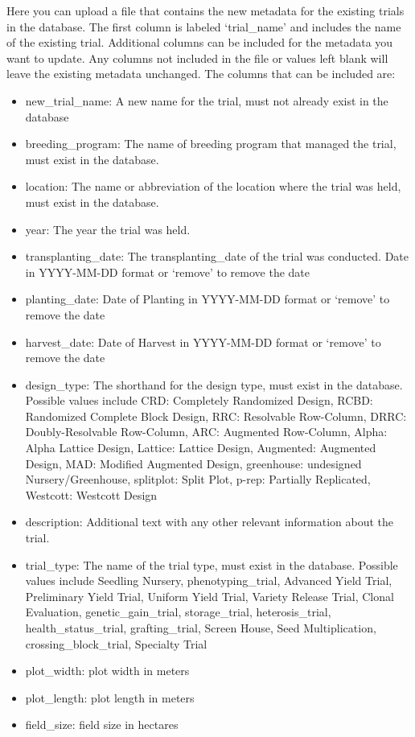 \documentclass[
  12pt,
]{book}
\providecommand{\tightlist}{%
  \setlength{\itemsep}{0pt}\setlength{\parskip}{0pt}}
\begin{document}
Here you can upload a file that contains the new metadata for the existing trials in the database. The first column is labeled `trial\_name' and includes the name of the existing trial. Additional columns can be included for the metadata you want to update. Any columns not included in the file or values left blank will leave the existing metadata unchanged. The columns that can be included are:

\begin{itemize}
\tightlist
\item
  new\_trial\_name: A new name for the trial, must not already exist in the database
\item
  breeding\_program: The name of breeding program that managed the trial, must exist in the database.
\item
  location: The name or abbreviation of the location where the trial was held, must exist in the database.
\item
  year: The year the trial was held.
\item
  transplanting\_date: The transplanting\_date of the trial was conducted. Date in YYYY-MM-DD format or `remove' to remove the date
\item
  planting\_date: Date of Planting in YYYY-MM-DD format or `remove' to remove the date
\item
  harvest\_date: Date of Harvest in YYYY-MM-DD format or `remove' to remove the date
\item
  design\_type: The shorthand for the design type, must exist in the database. Possible values include CRD: Completely Randomized Design, RCBD: Randomized Complete Block Design, RRC: Resolvable Row-Column, DRRC: Doubly-Resolvable Row-Column, ARC: Augmented Row-Column, Alpha: Alpha Lattice Design, Lattice: Lattice Design, Augmented: Augmented Design, MAD: Modified Augmented Design, greenhouse: undesigned Nursery/Greenhouse, splitplot: Split Plot, p-rep: Partially Replicated, Westcott: Westcott Design
\item
  description: Additional text with any other relevant information about the trial.
\item
  trial\_type: The name of the trial type, must exist in the database. Possible values include Seedling Nursery, phenotyping\_trial, Advanced Yield Trial, Preliminary Yield Trial, Uniform Yield Trial, Variety Release Trial, Clonal Evaluation, genetic\_gain\_trial, storage\_trial, heterosis\_trial, health\_status\_trial, grafting\_trial, Screen House, Seed Multiplication, crossing\_block\_trial, Specialty Trial
\item
  plot\_width: plot width in meters
\item
  plot\_length: plot length in meters
\item
  field\_size: field size in hectares
\end{itemize}
\end{document}
